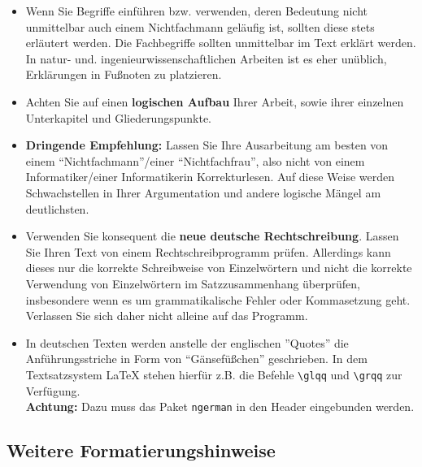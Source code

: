 \begin{itemize}
\item Wenn Sie Begriffe einführen bzw. verwenden, deren Bedeutung nicht unmittelbar auch einem Nichtfachmann geläufig ist, sollten diese stets erläutert werden. 
Die Fachbegriffe sollten unmittelbar im Text erklärt werden. 
In natur- und. ingenieurwissenschaftlichen Arbeiten ist es eher unüblich, Erklärungen in Fußnoten zu platzieren. 
\item Achten Sie auf einen {\bf logischen Aufbau} Ihrer Arbeit, sowie ihrer einzelnen Unterkapitel und Gliederungspunkte.
\item {\bf Dringende Empfehlung:} Lassen Sie Ihre Ausarbeitung am besten von einem "`Nichtfachmann"'/einer "`Nichtfachfrau"', also nicht von einem Informatiker/einer Informatikerin Korrekturlesen.
Auf diese Weise werden Schwachstellen in Ihrer Argumentation und andere logische Mängel am deutlichsten.
\item Verwenden Sie konsequent die {\bf neue deutsche Rechtschreibung}.
Lassen Sie Ihren Text von einem Rechtschreibprogramm prüfen.
Allerdings kann dieses nur die korrekte Schreibweise von Einzelwörtern und nicht die korrekte Verwendung von Einzelwörtern im Satzzusammenhang überprüfen, insbesondere wenn es um grammatikalische Fehler oder Kommasetzung geht.
Verlassen Sie sich daher nicht alleine auf das Programm.
\item In deutschen Texten werden anstelle der englischen ''Quotes'' die Anführungsstriche in Form von "`Gänsefüßchen"' geschrieben. 
In dem Textsatzsystem {\LaTeX} stehen hierfür z.B. die Befehle \verb|\glqq| und \verb|\grqq| zur Verfügung. \\
{\bf Achtung:} Dazu muss das Paket {\tt ngerman} in den Header eingebunden werden.
\end{itemize}



\subsection{Weitere Formatierungshinweise}
